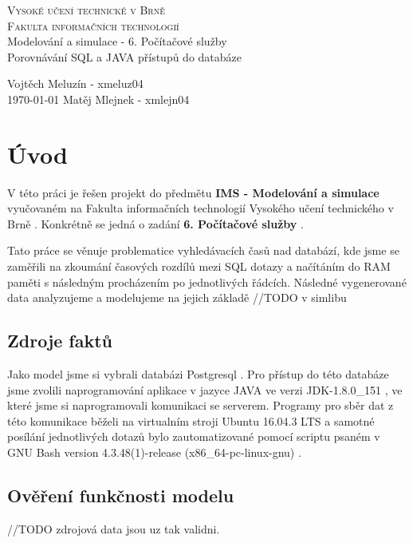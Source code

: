 \documentclass[a4paper, 11pt]{article}
\begin{document}
\thispagestyle{empty}
\begin{center}
\Huge
\textsc{Vysoké učení technické v Brně}\\
\huge
\textsc{Fakulta informačních technologií}\\
\LARGE
{}
Modelování a simulace - 6. Počítačové služby\\ \Huge Porovnávání SQL a JAVA přístupů do databáze
\end{center}

{
\LARGE \hfill
Vojtěch Meluzín - xmeluz04\\
\today \hfill
Matěj Mlejnek - xmlejn04}

\newpage
\thispagestyle{empty}

\tableofcontents

\newpage
\setcounter{page}{1}
\section{Úvod}
V této práci je řešen projekt do předmětu \textbf{IMS - Modelování a simulace} \cite{ims_web} vyučovaném na Fakulta informačních technologií Vysokého učení technického v Brně \cite{fit_web}. Konkrétně se jedná o zadání \textbf{6. Počítačové služby} \cite{zadani_web}.

Tato práce se věnuje problematice vyhledávacích časů nad databází, kde jsme se zaměřili na zkoumání časových rozdílů mezi SQL dotazy a načítáním do RAM paměti s následným procházením po jednotlivých řádcích. Následné vygenerované data analyzujeme a modelujeme na jejich základě //TODO v simlibu\cite{simlib_web, simlib_zdroj}
\subsection{Zdroje faktů}
Jako model jsme si vybrali databázi Postgresql \cite{postgresql_web}. Pro přístup do této databáze jsme zvolili naprogramování aplikace v jazyce JAVA \cite{java_web} ve verzi JDK-1.8.0\_151 \cite{java_jdk_version}, ve které jsme si naprogramovali komunikaci se serverem. Programy pro sběr dat z této komunikace běželi na virtualním stroji Ubuntu 16.04.3 LTS \cite{ubuntu_web} a samotné posílání jednotlivých dotazů bylo zautomatizované pomocí scriptu psaném v GNU Bash version 4.3.48(1)-release (x86\_64-pc-linux-gnu) \cite{bash_web}.

\subsection{Ověření funkčnosti modelu}
//TODO zdrojová data jsou uz tak validni.
\end{document}
